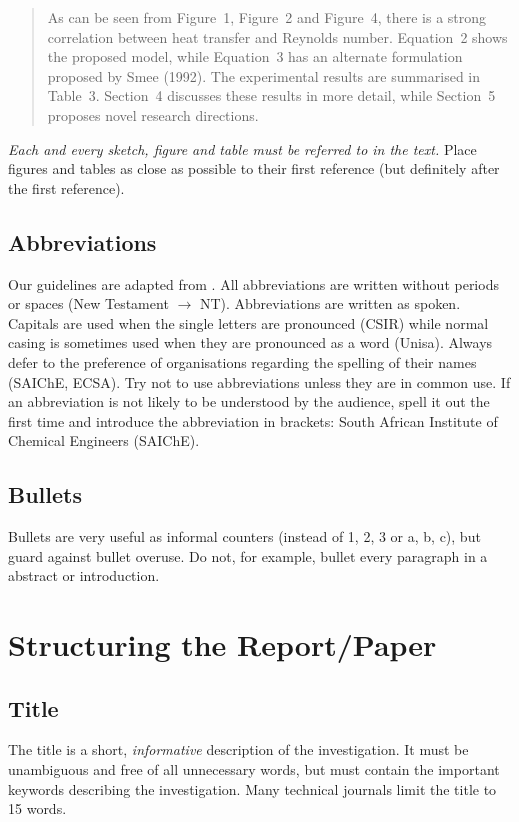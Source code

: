 \documentclass[a5paper, 10pt]{article}
\begin{document}
\begin{quote}
  As can be seen from Figure~1, Figure~2 and Figure~4, there is a strong
  correlation between heat transfer and Reynolds number.  Equation~2
  shows the proposed model, while Equation~3 has an alternate
  formulation proposed by Smee (1992).  The experimental results are
  summarised in Table~3.  Section~4 discusses these results in more
  detail, while Section~5 proposes novel research directions.
\end{quote}

\emph{Each and every sketch, figure and  table must be referred to in the text.} 
Place figures and tables as close as possible to their first reference (but definitely after the first reference).  


\subsection{Abbreviations}
\label{sec:abbreviations}
Our guidelines are adapted from \citet[17]{burger}.  All abbreviations
are written without periods or spaces (New Testament $\rightarrow$
NT).  Abbreviations are written as spoken. Capitals are used when the
single letters are pronounced (CSIR) while normal casing is sometimes used
when they are pronounced as a word (Unisa).  Always defer to the
preference of organisations regarding the spelling of their names
(SAIChE, ECSA).  Try not to use abbreviations unless they are in
common use.  If an abbreviation is not likely to be understood by the
audience, spell it out the first time and introduce the abbreviation
in brackets: South African Institute of Chemical Engineers (SAIChE).

\subsection{Bullets}
\label{sec:bullets}
Bullets are very useful as informal counters (instead of 1, 2, 3 or a, b, c), but guard against bullet overuse.
Do not, for example, bullet every paragraph in a abstract or introduction.

\section{Structuring the Report/Paper}
\label{cha:structure}

\subsection{Title}
\label{sec:title}
The title is a short, \emph{informative} description of the
investigation.  It must be unambiguous and free of all unnecessary
words, but must contain the important keywords describing the
investigation. Many technical journals limit the title to 15 words.
\end{document}
